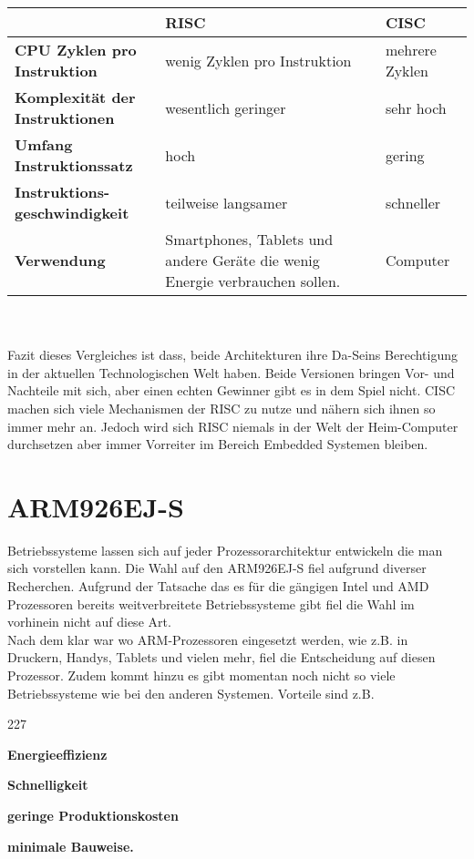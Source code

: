 \begin{tabular}[h!]{|p{4cm}|p{5cm}|p{5cm}|}
	\cline{1-3} 
	& \textbf{RISC} & \textbf{CISC} \\ \hline 
	\textbf{CPU Zyklen pro \newline Instruktion} & wenig Zyklen pro Instruktion & mehrere Zyklen \\ \hline
	\textbf{Komplexit\"at der \newline Instruktionen} & wesentlich geringer & sehr hoch \\ \hline
	\textbf{Umfang Instruktionssatz} & hoch & gering \\ \hline
	\textbf{Instruktions-\newline geschwindigkeit} &  teilweise langsamer & schneller \\ \hline
	\textbf{Verwendung}  & Smartphones, Tablets und andere Ger\"ate die wenig Energie verbrauchen sollen. & Computer \\ \hline	 
\end{tabular}
\\\\
Fazit dieses Vergleiches ist dass, beide Architekturen ihre Da-Seins Berechtigung in der aktuellen Technologischen Welt haben. Beide Versionen bringen Vor- und Nachteile mit sich, aber einen echten Gewinner gibt es in dem Spiel nicht. CISC machen sich viele Mechanismen der RISC zu nutze und n\"ahern sich ihnen so immer mehr an. Jedoch wird sich RISC niemals in der Welt der Heim-Computer durchsetzen aber immer Vorreiter im Bereich Embedded Systemen bleiben.
\section{ARM926EJ-S}
Betriebssysteme lassen sich auf jeder Prozessorarchitektur entwickeln die man sich vorstellen kann. Die Wahl auf den ARM926EJ-S fiel aufgrund diverser Recherchen. Aufgrund der Tatsache das es f\"ur die g\"angigen Intel und AMD Prozessoren bereits weitverbreitete Betriebssysteme gibt fiel die Wahl im vorhinein nicht auf diese Art.\\
Nach dem klar war wo ARM-Prozessoren eingesetzt werden, wie z.B. in Druckern, Handys, Tablets und vielen mehr, fiel die Entscheidung auf diesen Prozessor. Zudem kommt hinzu es gibt momentan noch nicht so viele Betriebssysteme wie bei den anderen Systemen. Vorteile sind z.B.
\begin{dinglist}{227}
	\item{\textbf{Energieeffizienz}}
	\item{\textbf{Schnelligkeit}}
	\item{\textbf{geringe Produktionskosten}}
	\item{\textbf{minimale Bauweise.}}
\end{dinglist}
\newpage
